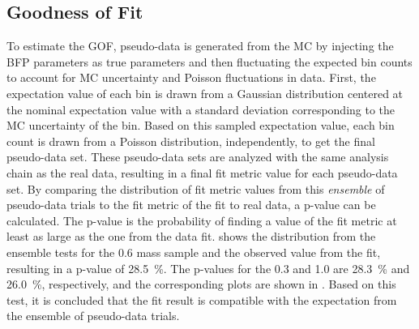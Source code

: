 \subsection{Goodness of Fit} 

To estimate the GOF, pseudo-data is generated from the MC by injecting the BFP parameters as true parameters and then fluctuating the expected bin counts to account for MC uncertainty and Poisson fluctuations in data. First, the expectation value of each bin is drawn from a Gaussian distribution centered at the nominal expectation value with a standard deviation corresponding to the MC uncertainty of the bin. Based on this sampled expectation value, each bin count is drawn from a Poisson distribution, independently, to get the final pseudo-data set. These pseudo-data sets are analyzed with the same analysis chain as the real data, resulting in a final fit metric value for each pseudo-data set. By comparing the distribution of fit metric values from this \textit{ensemble} of pseudo-data trials to the fit metric of the fit to real data, a p-value can be calculated. The p-value is the probability of finding a value of the fit metric at least as large as the one from the data fit.  shows the distribution from the ensemble tests for the \SI{0.6}{\gev} mass sample and the observed value from the fit, resulting in a p-value of \SI{28.5}{\percent}. The p-values for the \SI{0.3}{\gev} and \SI{1.0}{\gev} are \SI{28.3}{\percent} and \SI{26.0}{\percent}, respectively, and the corresponding plots are shown in . Based on this test, it is concluded that the fit result is compatible with the expectation from the ensemble of pseudo-data trials.

